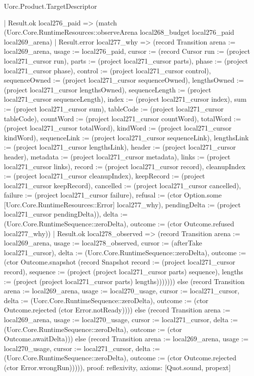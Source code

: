 \begin{lexlean}{Uorc.Product.TargetDescriptor}
\begin{semanticmodule}
{      | Result.ok local276_paid => (match (Uorc.Core.RuntimeResources::observeArena local268_budget local276_paid local269_arena)
        | Result.error local277_why => (record Transition {arena := local269_arena, usage := local276_paid, cursor := (record Cursor {run := (project local271_cursor run), parts := (project local271_cursor parts), phase := (project local271_cursor phase), control := (project local271_cursor control), sequenceOwned := (project local271_cursor sequenceOwned), lengthsOwned := (project local271_cursor lengthsOwned), sequenceLength := (project local271_cursor sequenceLength), index := (project local271_cursor index), sum := (project local271_cursor sum), tableCode := (project local271_cursor tableCode), countWord := (project local271_cursor countWord), totalWord := (project local271_cursor totalWord), kindWord := (project local271_cursor kindWord), sequenceLink := (project local271_cursor sequenceLink), lengthsLink := (project local271_cursor lengthsLink), header := (project local271_cursor header), metadata := (project local271_cursor metadata), links := (project local271_cursor links), record := (project local271_cursor record), cleanupIndex := (project local271_cursor cleanupIndex), keepRecord := (project local271_cursor keepRecord), cancelled := (project local271_cursor cancelled), failure := (project local271_cursor failure), refusal := (ctor Option.some [Uorc.Core.RuntimeResources::Error] local277_why), pendingDelta := (project local271_cursor pendingDelta)}), delta := (Uorc.Core.RuntimeSequence::zeroDelta), outcome := (ctor Outcome.refused local277_why)})
        | Result.ok local278_observed => (record Transition {arena := local269_arena, usage := local278_observed, cursor := (afterTake local271_cursor), delta := (Uorc.Core.RuntimeSequence::zeroDelta), outcome := (ctor Outcome.snapshot (record Snapshot {record := (project local271_cursor record), sequence := (project (project local271_cursor parts) sequence), lengths := (project (project local271_cursor parts) lengths)}))})))) else (record Transition {arena := local269_arena, usage := local270_usage, cursor := local271_cursor, delta := (Uorc.Core.RuntimeSequence::zeroDelta), outcome := (ctor Outcome.rejected (ctor Error.notReady))})) else (record Transition {arena := local269_arena, usage := local270_usage, cursor := local271_cursor, delta := (Uorc.Core.RuntimeSequence::zeroDelta), outcome := (ctor Outcome.awaitDelta)})) else (record Transition {arena := local269_arena, usage := local270_usage, cursor := local271_cursor, delta := (Uorc.Core.RuntimeSequence::zeroDelta), outcome := (ctor Outcome.rejected (ctor Error.wrongRun))}))),
  proof: reflexivity{},
  axioms: [Quot.sound, propext]
}


\end{semanticmodule}
\end{lexlean}
